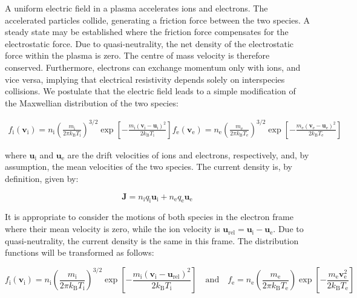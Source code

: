 A uniform electric field in a plasma accelerates ions and electrons. The accelerated particles collide, generating a friction force between the two species. A steady state may be established where the friction force compensates for the electrostatic force. Due to quasi-neutrality, the net density of the electrostatic force within the plasma is zero. The centre of mass velocity is therefore conserved. Furthermore, electrons can exchange momentum only with ions, and vice versa, implying that electrical resistivity depends solely on interspecies collisions. We postulate that the electric field leads to a simple modification of the Maxwellian distribution of the two species:

\begin{gather*}
    f_\mathrm{i}(\mathbf{v}_\mathrm{i})=n_\mathrm{i}\left(\frac{m_\mathrm{i}}{2\pi k_\mathrm{B}T_\mathrm{i}}\right)^{3/2}\exp{\left[-\frac{m_\mathrm{i}(\mathbf{v}_\mathrm{i}-\mathbf{u}_\mathrm{i})^2}{2k_\mathrm{B}T_\mathrm{i}}\right]}
    f_\text{e}(\mathbf{v}_\text{e})=n_\text{e}\left(\frac{m_\text{e}}{2\pi k_\mathrm{B}T_\text{e}}\right)^{3/2}\exp{\left[-\frac{m_\text{e}(\mathbf{v}_\text{e}-\mathbf{u}_\text{e})^2}{2k_\mathrm{B}T_\text{e}}\right]}
\end{gather*}

where $\mathbf{u}_\mathrm{i}$ and $\mathbf{u}_\text{e}$ are the drift velocities of ions and electrons, respectively, and, by assumption, the mean velocities of the two species. The current density is, by definition, given by:

\begin{equation}
    \mathbf{J}=n_\mathrm{i}q_\mathrm{i}\mathbf{u}_\mathrm{i}+n_\text{e}q_\text{e}\mathbf{u}_\text{e}
\end{equation}

It is appropriate to consider the motions of both species in the electron frame where their mean velocity is zero, while the ion velocity is $\mathbf{u}_\text{rel}=\mathbf{u}_\mathrm{i}-\mathbf{u}_\text{e}$. Due to quasi-neutrality, the current density is the same in this frame. The distribution functions will be transformed as follows:

\begin{equation*}
    f_\mathrm{i}(\mathbf{v}_\mathrm{i})=n_\mathrm{i}\left(\frac{m_\mathrm{i}}{2\pi k_\mathrm{B}T_\mathrm{i}}\right)^{3/2}\exp{\left[-\frac{m_\mathrm{i}\left(\mathbf{v}_\mathrm{i}-\mathbf{u}_\text{rel}\right)^2}{2k_\mathrm{B}T_\mathrm{i}}\right]}\quad\text{and}\quad f_\text{e}=n_\text{e}\left(\frac{m_\text{e}}{2 \pi k_\mathrm{B}T_\text{e}}\right)\exp{\left[-\frac{m_\text{e}\mathbf{v}_\text{e}^2}{2k_\mathrm{B}T_\text{e}}\right]}
\end{equation*}

